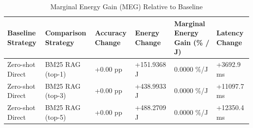 \begin{table}
\caption{Marginal Energy Gain (MEG) Relative to Baseline}
\label{tab:marginal_energy_gain}
\begin{tabular}{llllll}
\toprule
Baseline Strategy & Comparison Strategy & Accuracy Change & Energy Change & Marginal Energy Gain (\% / J) & Latency Change \\
\midrule
Zero-shot Direct & BM25 RAG (top-1) & +0.00 pp & +151.9368 J & 0.0000 \%/J & +3692.9 ms \\
Zero-shot Direct & BM25 RAG (top-3) & +0.00 pp & +438.9933 J & 0.0000 \%/J & +11097.7 ms \\
Zero-shot Direct & BM25 RAG (top-5) & +0.00 pp & +488.2709 J & 0.0000 \%/J & +12350.4 ms \\
\bottomrule
\end{tabular}
\end{table}
